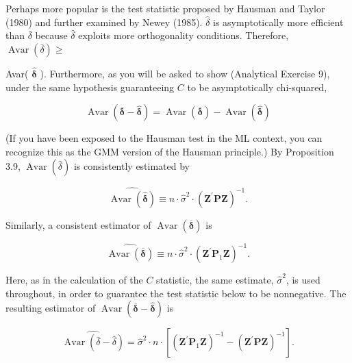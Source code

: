 \documentclass[10pt]{article}
\begin{document}
Perhaps more popular is the test statistic proposed by Hausman and Taylor (1980) and further examined by Newey (1985). $\hat{\delta}$ is asymptotically more efficient than $\bar{\delta}$ because $\hat{\delta}$ exploits more orthogonality conditions. Therefore, $\operatorname{Avar}(\bar{\delta}) \geq$

Avar( $\hat{\boldsymbol{\delta}}$ ). Furthermore, as you will be asked to show (Analytical Exercise 9), under the same hypothesis guaranteeing $C$ to be asymptotically chi-squared,


\begin{equation*}
\operatorname{Avar}(\overline{\boldsymbol{\delta}}-\hat{\boldsymbol{\delta}})=\operatorname{Avar}(\overline{\boldsymbol{\delta}})-\operatorname{Avar}(\hat{\boldsymbol{\delta}}) \tag{3.8.18}
\end{equation*}


(If you have been exposed to the Hausman test in the ML context, you can recognize this as the GMM version of the Hausman principle.) By Proposition 3.9, $\operatorname{Avar}(\hat{\delta})$ is consistently estimated by


\begin{equation*}
\widehat{\operatorname{Avar}(\hat{\boldsymbol{\delta}})} \equiv n \cdot \hat{\sigma}^{2} \cdot\left(\mathbf{Z}^{\prime} \mathbf{P} \mathbf{Z}\right)^{-1} . \tag{3.8.19}
\end{equation*}


Similarly, a consistent estimator of $\operatorname{Avar}(\overline{\boldsymbol{\delta}})$ is


\begin{equation*}
\widehat{\operatorname{Avar}(\overline{\boldsymbol{\delta}})} \equiv n \cdot \hat{\sigma}^{2} \cdot\left(\mathbf{Z}^{\prime} \mathbf{P}_{1} \mathbf{Z}\right)^{-1} . \tag{3.8.20}
\end{equation*}


Here, as in the calculation of the $C$ statistic, the same estimate, $\hat{\sigma}^{2}$, is used throughout, in order to guarantee the test statistic below to be nonnegative. The resulting estimator of $\operatorname{Avar}(\overline{\boldsymbol{\delta}}-\hat{\boldsymbol{\delta}})$ is


\begin{equation*}
\widehat{\operatorname{Avar}(\bar{\delta}-\hat{\delta})}=\hat{\sigma}^{2} \cdot n \cdot\left[\left(\mathbf{Z}^{\prime} \mathbf{P}_{1} \mathbf{Z}\right)^{-1}-\left(\mathbf{Z}^{\prime} \mathbf{P} \mathbf{Z}\right)^{-1}\right] . \tag{3.8.21}
\end{equation*}
\end{document}
